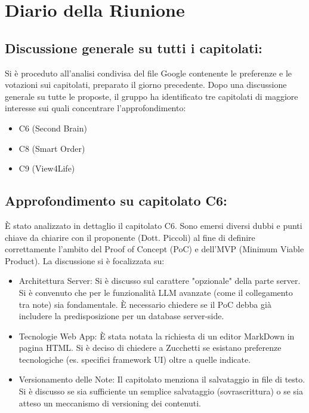 \documentclass[a4paper, 11pt, oneside]{scrartcl} %
\begin{document}
\newpage
\section{Diario della Riunione}

\subsection{Discussione generale su tutti i capitolati:}

Si è proceduto all'analisi condivisa del file Google contenente le preferenze e le votazioni sui capitolati, preparato il giorno precedente. Dopo una discussione generale su tutte le proposte, il gruppo ha identificato tre capitolati di maggiore interesse sui quali concentrare l'approfondimento:
\begin{itemize}
    \item C6 (Second Brain)
    \item C8 (Smart Order)
    \item C9 (View4Life)
\end{itemize}


\subsection{Approfondimento su capitolato C6:}
È stato analizzato in dettaglio il capitolato C6. Sono emersi diversi dubbi e punti chiave da chiarire con il proponente (Dott. Piccoli) al fine di definire correttamente l'ambito del Proof of Concept (PoC) e dell'MVP (Minimum Viable Product). 
La discussione si è focalizzata su:
\begin{itemize}
    \item Architettura Server: Si è discusso sul carattere "opzionale" della parte server. Si è convenuto che per le funzionalità LLM avanzate (come il collegamento tra note) sia fondamentale. È necessario chiedere se il PoC debba già includere la predisposizione per un database server-side.
    \item Tecnologie Web App: È stata notata la richiesta di un editor MarkDown in pagina HTML. Si è deciso di chiedere a Zucchetti se esistano preferenze tecnologiche (es. specifici framework UI) oltre a quelle indicate.
    \item Versionamento delle Note: Il capitolato menziona il salvataggio in file di testo. Si è discusso se sia sufficiente un semplice salvataggio (sovrascrittura) o se sia atteso un meccanismo di versioning dei contenuti.
\end{itemize}
\end{document}
